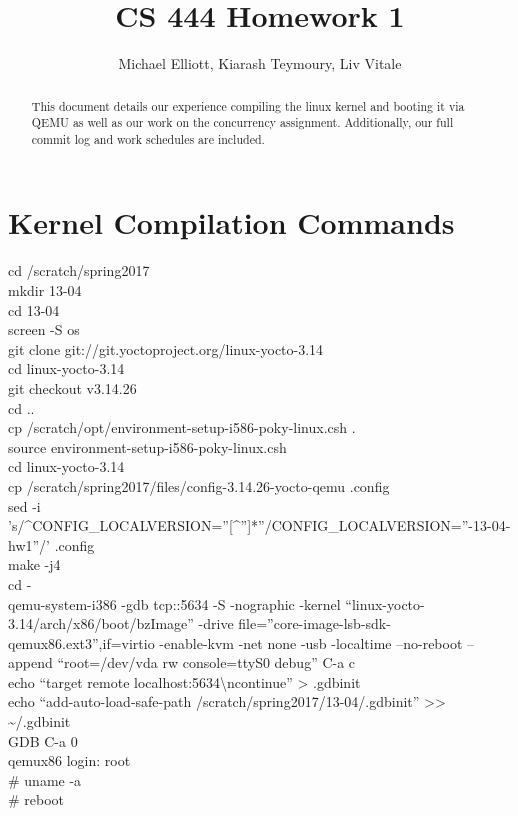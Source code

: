 \documentclass[letterpaper,10pt,titlepage,draftclsnofoot,onecolumn]{IEEEtran}
\title{CS 444 Homework 1}
\author{Michael Elliott, Kiarash Teymoury, Liv Vitale}
\begin{document}
\begin{titlingpage}
\maketitle
\begin{abstract}
This document details our experience compiling the linux kernel and booting it via QEMU as well as our work on the concurrency assignment. Additionally, our full commit log and work schedules are included.
\end{abstract}
\end{titlingpage}

\section{Kernel Compilation Commands}
\textdollar{} cd /scratch/spring2017
\\\textdollar{} mkdir 13-04
\\\textdollar{} cd 13-04
\\\textdollar{} screen -S os
\\\textdollar{} git clone git://git.yoctoproject.org/linux-yocto-3.14
\\\textdollar{} cd linux-yocto-3.14
\\\textdollar{} git checkout v3.14.26
\\\textdollar{} cd ..
\\\textdollar{} cp /scratch/opt/environment-setup-i586-poky-linux.csh .
\\\textdollar{} source environment-setup-i586-poky-linux.csh
\\\textdollar{} cd linux-yocto-3.14
\\\textdollar{} cp /scratch/spring2017/files/config-3.14.26-yocto-qemu .config
\\\textdollar{} sed -i 's/\^{}CONFIG\_LOCALVERSION=''[\^{}'']*''\textdollar{}/CONFIG\_LOCALVERSION=''-13-04-hw1''/' .config
\\\textdollar{} make -j4
\\\textdollar{} cd -
\\\textdollar{} qemu-system-i386 -gdb tcp::5634 -S -nographic -kernel ``linux-yocto-3.14/arch/x86/boot/bzImage'' -drive file=''core-image-lsb-sdk-qemux86.ext3'',if=virtio -enable-kvm -net none -usb -localtime --no-reboot --append ``root=/dev/vda rw console=ttyS0 debug''
C-a c
\\\textdollar{} echo ``target remote localhost:5634\textbackslash{}ncontinue'' \textgreater{} .gdbinit
\\\textdollar{} echo ``add-auto-load-safe-path /scratch/spring2017/13-04/.gdbinit'' \textgreater{}\textgreater{} \textasciitilde{}/.gdbinit
\\\textdollar{} \textdollar{}GDB
C-a 0
\\qemux86 login: root
\\\# uname -a
\\\# reboot
\end{document}
